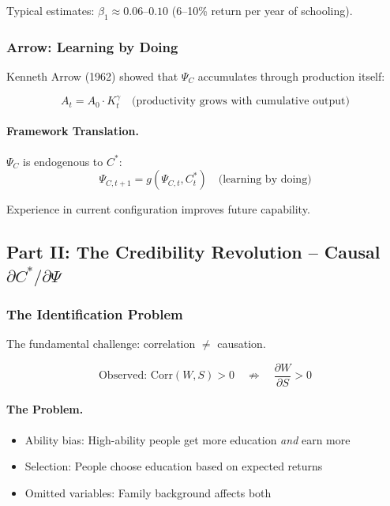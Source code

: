 Typical estimates: $\beta_1 \approx 0.06$--$0.10$ (6--10\% return per year of schooling).

\subsubsection{Arrow: Learning by Doing}

Kenneth Arrow (1962) showed that $\Psi_C$ accumulates through production itself:

\begin{equation}
\boxed{
A_t = A_0 \cdot K_t^\gamma \quad \text{(productivity grows with cumulative output)}
}
\label{eq:arrow-lbd}
\end{equation}

\paragraph{Framework Translation.}
$\Psi_C$ is endogenous to $C^*$:
\begin{equation}
\Psi_{C,t+1} = g(\Psi_{C,t}, C^*_t) \quad \text{(learning by doing)}
\end{equation}

Experience in current configuration improves future capability.

\subsection{Part II: The Credibility Revolution – Causal $\partial C^* / \partial \Psi$}

\subsubsection{The Identification Problem}

The fundamental challenge: correlation $\neq$ causation.

\begin{equation}
\text{Observed: } \text{Corr}(W, S) > 0 \quad \not\Rightarrow \quad \frac{\partial W}{\partial S} > 0
\end{equation}

\paragraph{The Problem.}
\begin{itemize}
    \item Ability bias: High-ability people get more education \textit{and} earn more
    \item Selection: People choose education based on expected returns
    \item Omitted variables: Family background affects both
\end{itemize}


